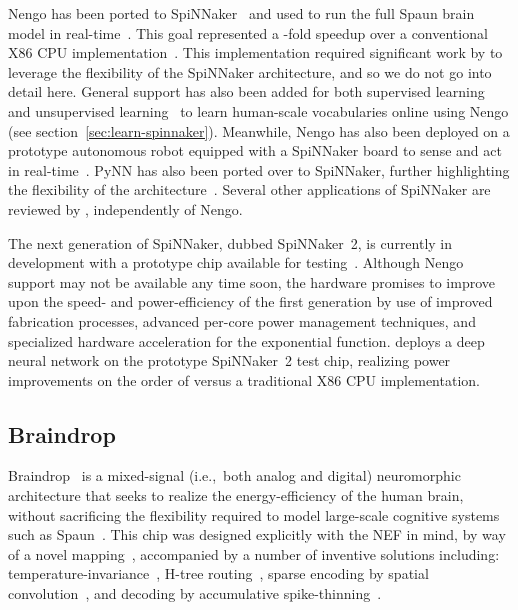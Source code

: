 Nengo has been ported to SpiNNaker~\citep{galluppi2012real, mundy2015} and used to run the full Spaun brain model in real-time~\citep{mundy2016real}.
This goal represented a -fold speedup over a conventional X86 CPU implementation~\citep{stewart2014large}.
This implementation required significant work by \citet{mundy2016real} to leverage the flexibility of the SpiNNaker architecture, and so we do not go into detail here.
General support has also been added for both supervised learning~\citep{davies2013} and unsupervised learning~\citep{knight2016} to learn human-scale vocabularies online using Nengo (see section~\ref{sec:learn-spinnaker}).
Meanwhile, Nengo has also been deployed on a prototype autonomous robot equipped with a SpiNNaker board to sense and act in real-time~\citep{galluppi2014}.
PyNN has also been ported over to SpiNNaker, further highlighting the flexibility of the architecture~\citep{rhodes2018spynnaker}.
Several other applications of SpiNNaker are reviewed by \citet{rhodes2018spynnaker}, independently of Nengo.

The next generation of SpiNNaker, dubbed SpiNNaker~2, is currently in development with a prototype chip available for testing~\citep{liu2018memory}.
Although Nengo support may not be available any time soon, the hardware promises to improve upon the speed- and power-efficiency of the first generation by use of improved fabrication processes, advanced per-core power management techniques, and specialized hardware acceleration for the exponential function.
\citet{liu2018memory} deploys a deep neural network on the prototype SpiNNaker~2 test chip, realizing power improvements on the order of  versus a traditional X86 CPU implementation.

\subsection{Braindrop}

Braindrop~\citep{braindrop2019} is a mixed-signal (i.e.,~both analog and digital) neuromorphic architecture that seeks to realize the energy-efficiency of the human brain, without sacrificing the flexibility required to model large-scale cognitive systems such as Spaun~\citep{eliasmith2012}.
This chip was designed explicitly with the NEF in mind, by way of a novel mapping~\citep{voelker2017iscas, neckar2018optimizing}, accompanied by a number of inventive solutions including: temperature-invariance~\citep{abrams2017, reidpint2019, benjamintemp2019}, H-tree routing~\citep{fokserial2018}, sparse encoding by spatial convolution~\citep{feinstein1988hexagonal, braindrop2019}, and decoding by accumulative spike-thinning~\citep{fokthinning2019}.

